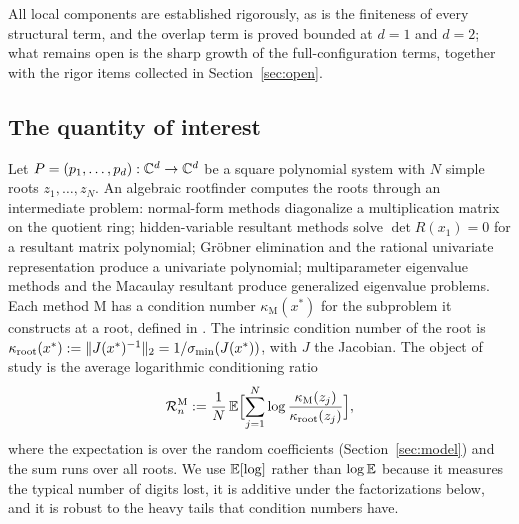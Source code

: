 All local components are established rigorously, as is the finiteness of every structural term,
and the overlap term is proved bounded at $d=1$ and $d=2$; what remains open is the sharp
growth of the full-configuration terms, together with the rigor items collected in
Section~\ref{sec:open}.

\subsection{The quantity of interest}\label{sec:quantity}

Let $P=(p_1,\dots,p_d):\mathbb{C}^d\to\mathbb{C}^d$ be a square polynomial system with $N$ simple roots
$z_1,\dots,z_N$. An algebraic rootfinder computes the roots through an intermediate problem:
normal-form methods diagonalize a multiplication matrix on the quotient ring; hidden-variable
resultant methods solve $\det R(x_1)=0$ for a resultant matrix polynomial; Gr\"obner
elimination and the rational univariate representation produce a univariate polynomial;
multiparameter eigenvalue methods and the Macaulay resultant produce generalized eigenvalue
problems. Each method M has a condition number $\kappa_{\mathrm{M}}(x^*)$ for the subproblem it
constructs at a root, defined in \cite{graf2026numerical,noferini2016numerical}. The intrinsic
condition number of the root is $\kappa_{\mathrm{root}}(x^*):=\|J(x^*)^{-1}\|_2 = 1/\sigma_{\min}(J(x^*))$,
with $J$ the Jacobian. The object of study is the average logarithmic conditioning ratio
\begin{equation}\label{eq:ratio}
  \mathcal{R}_n^{\mathrm{M}} := \frac1N\, \mathbb{E}\Bigl[\sum_{j=1}^N \log
  \frac{\kappa_{\mathrm{M}}(z_j)}{\kappa_{\mathrm{root}}(z_j)}\Bigr],
\end{equation}
where the expectation is over the random coefficients (Section~\ref{sec:model}) and the sum
runs over all roots. We use $\mathbb{E}[\log]$ rather than $\log\mathbb{E}$ because it measures the typical
number of digits lost, it is additive under the factorizations below, and it is robust to the
heavy tails that condition numbers have.

